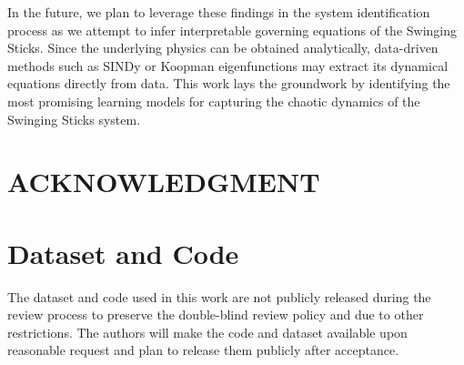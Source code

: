 \documentclass[letterpaper, 10pt, conference]{IEEEtran}
\begin{document}
        
        In the future, we plan to leverage these findings in the system
        identification process as we attempt to infer interpretable governing
        equations of the Swinging Sticks. Since the underlying physics can be
        obtained analytically, data-driven methods such as SINDy or Koopman
        eigenfunctions may extract its dynamical equations directly from data.
        This work lays the groundwork by identifying the most promising learning
        models for capturing the chaotic dynamics of the Swinging Sticks system.


    
 \section*{ACKNOWLEDGMENT}


    
    \section{Dataset and Code}
        The dataset and code used in this work are not publicly released during the review process to preserve the double-blind review policy and due to other restrictions. The authors will make the code and dataset available upon reasonable request and plan to release them publicly after acceptance.








\end{document}
